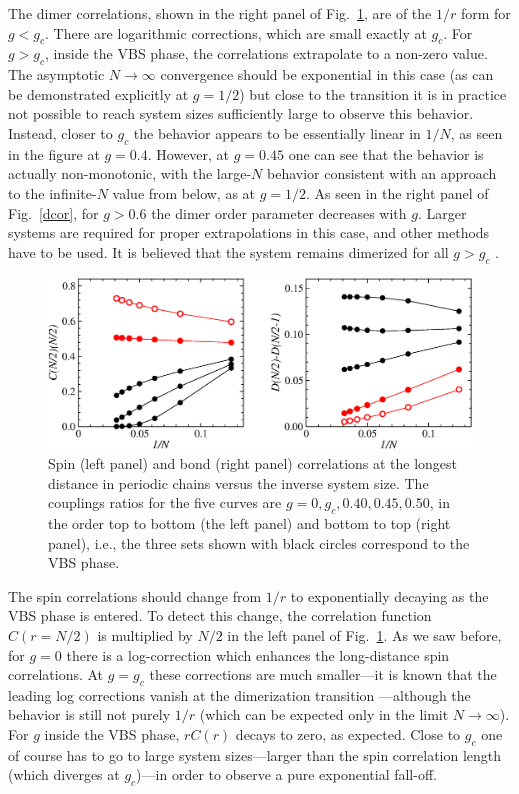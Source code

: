 \documentclass[draft,numberedheadings]{aipproc}
\begin{document}
The dimer correlations, shown in the right panel of Fig.~\ref{cor_n}, are of the $1/r$ form for $g<g_c$. There are logarithmic corrections, which are small
exactly at $g_c$. For $g > g_c$, inside the VBS phase, the correlations extrapolate to a non-zero value. The asymptotic $N \to \infty$ convergence should be 
exponential in this case (as can be demonstrated explicitly at $g=1/2$) but close to the transition it is in practice 
not possible to reach system sizes sufficiently large to observe this behavior. Instead, closer to $g_c$ the behavior appears to be essentially 
linear in $1/N$, as seen in the figure at $g=0.4$. However, at $g=0.45$ one can see that the behavior is actually non-monotonic, with the large-$N$ behavior 
consistent with an approach to the infinite-$N$ value from below, as at $g=1/2$. As seen in the right panel of Fig.~\ref{dcor}, for $g>0.6$ the dimer
order parameter decreases with $g$. Larger systems are required for proper extrapolations in this case, and other methods have to be used. It is believed that 
the system remains dimerized for all $g>g_c$ \cite{bursill96,kumar}.

\begin{figure}
\includegraphics[width=12.5cm, clip]{cor_n.eps}
\caption{Spin (left panel) and bond (right panel) correlations at the longest distance in periodic chains versus the inverse system size.
The couplings ratios for the five curves are $g=0,g_c,0.40,0.45,0.50$, in the order top to bottom (the left panel) and bottom to top (right panel), 
i.e., the three sets shown with black circles correspond to the VBS phase.}
\label{cor_n}
\end{figure}

The spin correlations should change from $1/r$ to exponentially decaying as the VBS phase is entered. To detect this change, the correlation function $C(r=N/2)$ 
is multiplied by $N/2$ in the left panel of Fig.~\ref{cor_n}. As we saw before, for $g=0$ there is a log-correction which enhances the long-distance spin
correlations. At $g=g_c$ these corrections are much smaller---it is known that the leading log corrections vanish at the dimerization transition 
\cite{eggert96b}---although the behavior is still not purely $1/r$ (which can be expected only in the limit $N \to \infty$). For $g$ inside the VBS 
phase, $rC(r)$ decays to zero, as expected. Close to $g_c$ one of course has to go to large system sizes---larger than the spin correlation length (which 
diverges at $g_c$)---in order to observe a pure exponential fall-off. 
\end{document}
